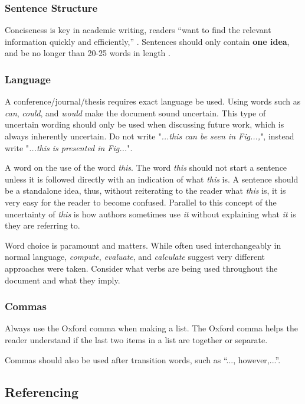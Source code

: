 \subsubsection{Sentence Structure}
Conciseness is key in academic writing, readers ``want to find the relevant information quickly and efficiently,'' \cite{writingSpringer}. 
Sentences should only contain \textbf{one idea}, and be no longer than 20-25 words in length \cite{writingSpringer}. 


\subsubsection{Language}

A conference/journal/thesis requires exact language be used. 
Using words such as \textit{can}, \textit{could}, and \textit{would} make the document sound uncertain. 
This type of uncertain wording should only be used when discussing future work, which is always inherently uncertain. 
Do not write "\textit{...this can be seen in Fig...,}", instead write "\textit{...this is presented in Fig...}".

A word on the use of the word \textit{this}. 
The word \textit{this} should not start a sentence unless it is followed directly with an indication of what \textit{this} is. 
A sentence should be a standalone idea, thus, without reiterating to the reader what \textit{this} is, it is very easy for the reader to become confused. 
Parallel to this concept of the uncertainty of \textit{this} is how authors sometimes use \textit{it} without explaining what \textit{it} is they are referring to. 

Word choice is paramount and matters. While often used interchangeably in normal language, \textit{compute}, \textit{evaluate}, and \textit{calculate} suggest very different approaches were taken. Consider what verbs are being used throughout the document and what they imply. 


\subsubsection{Commas}

Always use the Oxford comma when making a list. The Oxford comma helps the reader understand if the last two items in a list are together or separate. 

Commas should also be used after transition words, such as ``..., however,...''. 


\subsection{Referencing}

